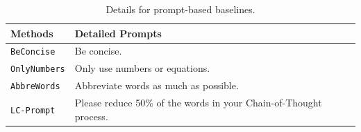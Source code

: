 \begin{table}[htbp]
\small
\centering
\setlength{\tabcolsep}{1.4mm}
\begin{tabular}{@{}>{\arraybackslash}m{55pt}>{\arraybackslash}m{150pt}@{}}
\toprule
\textbf{Methods} &\textbf{Detailed Prompts}  \\ \midrule
\texttt{BeConcise} & Be concise. \\
\texttt{OnlyNumbers} & Only use numbers or equations. \\
\texttt{AbbreWords} & Abbreviate words as much as possible. \\
\texttt{LC-Prompt} & Please reduce 50\% of the words in your Chain-of-Thought process.\\
\bottomrule
\end{tabular}%
\caption{Details for prompt-based baselines.}
\label{tab:prompts}
\end{table}